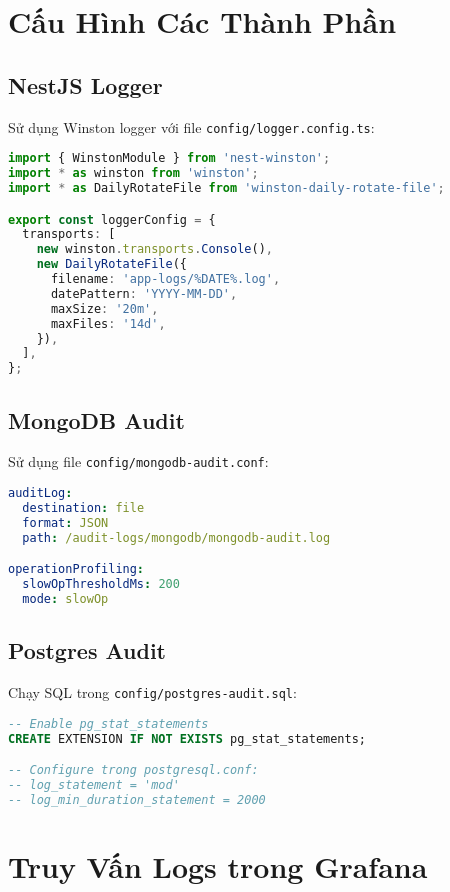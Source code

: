 \documentclass[a4paper,12pt]{article}
\begin{document}
\section{Cấu Hình Các Thành Phần}

\subsection{NestJS Logger}

Sử dụng Winston logger với file \texttt{config/logger.config.ts}:

\begin{lstlisting}[language=typescript]
import { WinstonModule } from 'nest-winston';
import * as winston from 'winston';
import * as DailyRotateFile from 'winston-daily-rotate-file';

export const loggerConfig = {
  transports: [
    new winston.transports.Console(),
    new DailyRotateFile({
      filename: 'app-logs/%DATE%.log',
      datePattern: 'YYYY-MM-DD',
      maxSize: '20m',
      maxFiles: '14d',
    }),
  ],
};
\end{lstlisting}

\subsection{MongoDB Audit}

Sử dụng file \texttt{config/mongodb-audit.conf}:

\begin{lstlisting}[language=yaml]
auditLog:
  destination: file
  format: JSON
  path: /audit-logs/mongodb/mongodb-audit.log

operationProfiling:
  slowOpThresholdMs: 200
  mode: slowOp
\end{lstlisting}

\subsection{Postgres Audit}

Chạy SQL trong \texttt{config/postgres-audit.sql}:

\begin{lstlisting}[language=sql]
-- Enable pg_stat_statements
CREATE EXTENSION IF NOT EXISTS pg_stat_statements;

-- Configure trong postgresql.conf:
-- log_statement = 'mod'
-- log_min_duration_statement = 2000
\end{lstlisting}

\section{Truy Vấn Logs trong Grafana}
\end{document}
